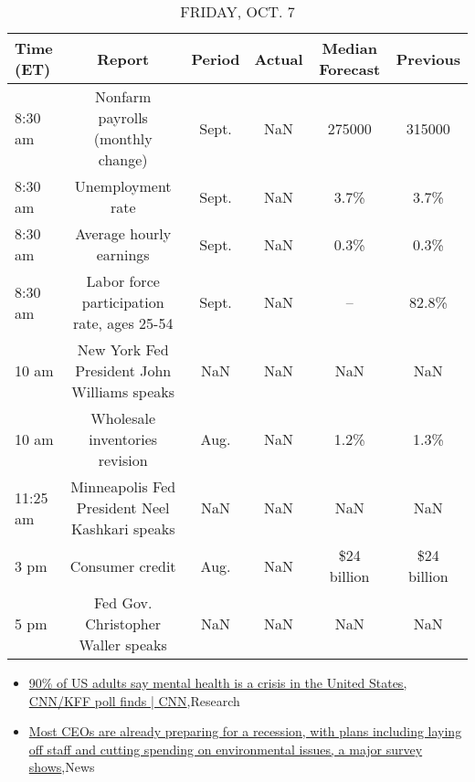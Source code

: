 \documentclass{article}%
\begin{document}
%


\begin{table}[htbp]%
\caption{FRIDAY, OCT. 7}%
\centering%
\begin{adjustbox}{width=1\textwidth}%
\begin{tabular}{lccccc}
\toprule
Time (ET) &                                         Report & Period & Actual & Median Forecast &    Previous \\
\midrule
  8:30 am &              Nonfarm payrolls (monthly change) &  Sept. &    NaN &          275000 &      315000 \\
  8:30 am &                              Unemployment rate &  Sept. &    NaN &            3.7\% &        3.7\% \\
  8:30 am &                        Average hourly earnings &  Sept. &    NaN &            0.3\% &        0.3\% \\
  8:30 am &     Labor force participation rate, ages 25-54 &  Sept. &    NaN &              -- &       82.8\% \\
    10 am &    New York Fed President John Williams speaks &    NaN &    NaN &             NaN &         NaN \\
    10 am &                 Wholesale inventories revision &   Aug. &    NaN &            1.2\% &        1.3\% \\
 11:25 am & Minneapolis Fed President Neel Kashkari speaks &    NaN &    NaN &             NaN &         NaN \\
     3 pm &                                Consumer credit &   Aug. &    NaN &     \$24 billion & \$24 billion \\
     5 pm &             Fed Gov. Christopher Waller speaks &    NaN &    NaN &             NaN &         NaN \\
\bottomrule
\end{tabular}
%
\end{adjustbox}%
\end{table}

%
\begin{itemize}%
\item%
\href{https://reddit.com/r/Economics/comments/xw8r4y/90\_of\_us\_adults\_say\_mental\_health\_is\_a\_crisis\_in/}{90\% of US adults say mental health is a crisis in the United States, CNN/KFF poll finds | CNN},Research%
\item%
\href{https://reddit.com/r/Economics/comments/xw7s30/most\_ceos\_are\_already\_preparing\_for\_a\_recession/}{Most CEOs are already preparing for a recession, with plans including laying off staff and cutting spending on environmental issues, a major survey shows},News%
\end{itemize}%
\end{document}
